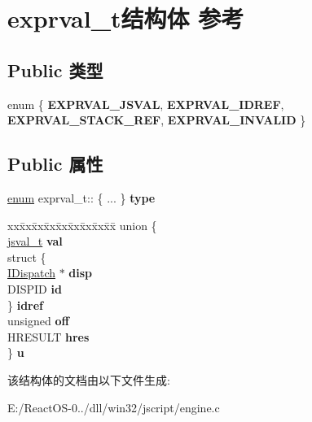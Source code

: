 \hypertarget{structexprval__t}{}\section{exprval\+\_\+t结构体 参考}
\label{structexprval__t}
\subsection*{Public 类型}
\begin{DoxyCompactItemize}
\item 
\mbox{\label{structexprval__t_ad595b06b4554ebfc79c9615a0af11aef}} 
enum \{ {\bfseries E\+X\+P\+R\+V\+A\+L\+\_\+\+J\+S\+V\+AL}, 
{\bfseries E\+X\+P\+R\+V\+A\+L\+\_\+\+I\+D\+R\+EF}, 
{\bfseries E\+X\+P\+R\+V\+A\+L\+\_\+\+S\+T\+A\+C\+K\+\_\+\+R\+EF}, 
{\bfseries E\+X\+P\+R\+V\+A\+L\+\_\+\+I\+N\+V\+A\+L\+ID}
 \}
\end{DoxyCompactItemize}
\subsection*{Public 属性}
\begin{DoxyCompactItemize}
\item 
\mbox{\label{structexprval__t_a834a4546bf143bc52be838f428116c64}} 
\hyperlink{interfaceenum}{enum} exprval\+\_\+t\+:: \{ ... \}  {\bfseries type}
\item 
\mbox{\label{structexprval__t_aabed85fc97a1f09d636a470149b33be1}} 
\begin{tabbing}
xx\=xx\=xx\=xx\=xx\=xx\=xx\=xx\=xx\=\kill
union \{\\
\>\hyperlink{struct__jsval__t}{jsval\_t} {\bfseries val}\\
\>struct \{\\
\>\>\hyperlink{interface_i_dispatch}{IDispatch} $\ast$ {\bfseries disp}\\
\>\>DISPID {\bfseries id}\\
\>\} {\bfseries idref}\\
\>unsigned {\bfseries off}\\
\>HRESULT {\bfseries hres}\\
\} {\bfseries u}\\

\end{tabbing}\end{DoxyCompactItemize}


该结构体的文档由以下文件生成\+:\begin{DoxyCompactItemize}
\item 
E\+:/\+React\+O\+S-\/0../dll/win32/jscript/engine.\+c\end{DoxyCompactItemize}
